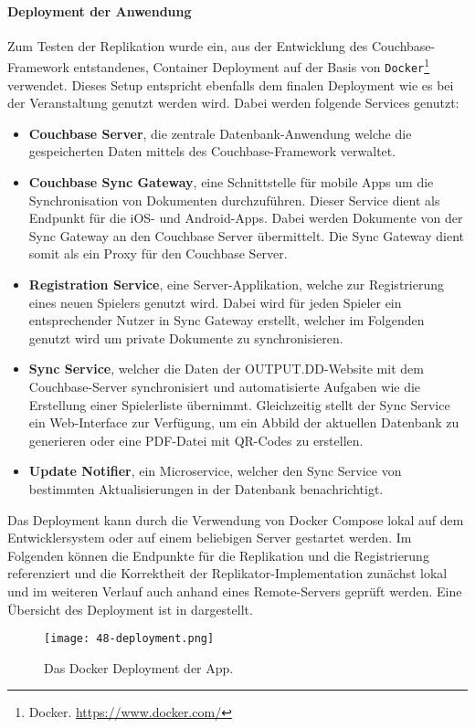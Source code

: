 \newpage

\paragraph{Deployment der Anwendung} Zum Testen der Replikation wurde ein, aus der Entwicklung des Couchbase-Framework entstandenes, Container Deployment auf der Basis von \texttt{Docker}\footnote{Docker. \url{https://www.docker.com/}} verwendet. Dieses Setup entspricht ebenfalls dem finalen Deployment wie es bei der Veranstaltung genutzt werden wird. Dabei werden folgende Services genutzt: 

\begin{itemize}
    \item \textbf{Couchbase Server}, die zentrale Datenbank-Anwendung welche die gespeicherten Daten mittels des Couchbase-Framework verwaltet.
    \item \textbf{Couchbase Sync Gateway}, eine Schnittstelle für mobile Apps um die Synchronisation von Dokumenten durchzuführen. Dieser Service dient als Endpunkt für die iOS- und Android-Apps. Dabei werden Dokumente von der Sync Gateway an den Couchbase Server übermittelt. Die Sync Gateway dient somit als ein Proxy für den Couchbase Server.
    \item \textbf{Registration Service}, eine Server-Applikation, welche zur Registrierung eines neuen Spielers genutzt wird. Dabei wird für jeden Spieler ein entsprechender Nutzer in Sync Gateway erstellt, welcher im Folgenden genutzt wird um private Dokumente zu synchronisieren.
    \item \textbf{Sync Service}, welcher die Daten der OUTPUT.DD-Website mit dem Couchbase-Server synchronisiert und automatisierte Aufgaben wie die Erstellung einer Spielerliste übernimmt. Gleichzeitig stellt der Sync Service ein Web-Interface zur Verfügung, um ein Abbild der aktuellen Datenbank zu generieren oder eine PDF-Datei mit QR-Codes zu erstellen. 
    \item \textbf{Update Notifier}, ein Microservice, welcher den Sync Service von bestimmten Aktualisierungen in der Datenbank benachrichtigt.
\end{itemize}

Das Deployment kann durch die Verwendung von Docker Compose lokal auf dem Entwicklersystem oder auf einem beliebigen Server gestartet werden. Im Folgenden können die Endpunkte für die Replikation und die Registrierung referenziert und die Korrektheit der Replikator-Implementation zunächst lokal und im weiteren Verlauf auch anhand eines Remote-Servers geprüft werden. Eine Übersicht des Deployment ist in  dargestellt.

\begin{figure}[H]
    \texttt{[image: 48-deployment.png]}
    \caption{Das Docker Deployment der App.}\label{fig:deployment}
\end{figure}